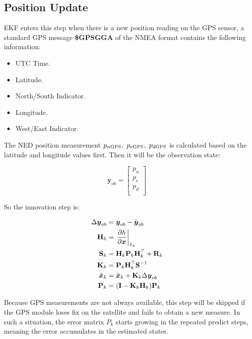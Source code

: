 \subsection{Position Update}

EKF enters this step when there is a new position reading on the GPS sensor, a standard GPS message \textbf{\$GPSGGA} of the NMEA format contains the following information:

\begin{itemize}
    \item UTC Time.
    \item Latitude.
    \item North/South Indicator.
    \item Longitude.
    \item West/East Indicator.
\end{itemize}

The NED position measurement $p_{n{\rm GPS}},\ p_{e{\rm GPS}},\ p_{d{\rm GPS}}$ is calculated based on the latitude and longitude values first. Then it will be the observation state:

\begin{equation}
    \boldsymbol{y}_{ob}=\left[\begin{array}{c}
        p_n  \\
        p_e  \\
        p_d  \\
    \end{array}\right]
\end{equation}

So the innovation step is:

\begin{align}
    \Delta \boldsymbol{y}_{ob} & =\boldsymbol{y}_{ob}-\Tilde{\boldsymbol{y}}_{ob} \\
    \textbf{H}_k &=\left.\frac{\partial h}{\partial \boldsymbol{x}}\right|_{\Tilde{x}_k} \\
    \textbf{S}_k &=\textbf{H}_k\textbf{P}_k\textbf{H}_k^\top+\textbf{R}_k \\
    \textbf{K}_k &=\textbf{P}_k\textbf{H}_k^\top\textbf{S}^{-1} \\
    \Tilde{\boldsymbol{x}}_k &=\Tilde{\boldsymbol{x}}_k+\textbf{K}_k\Delta \boldsymbol{y}_{ob} \\
    \textbf{P}_k &=(\textbf{I}-\textbf{K}_k\textbf{H}_k)\textbf{P}_k
\end{align}

Because GPS measurements are not always available, this step will be skipped if the GPS module loses fix on the satellite and fails to obtain a new measure. In such a situation, the error matrix $P_k$ starts growing in the repeated predict steps, meaning the error accumulates in the estimated states.

